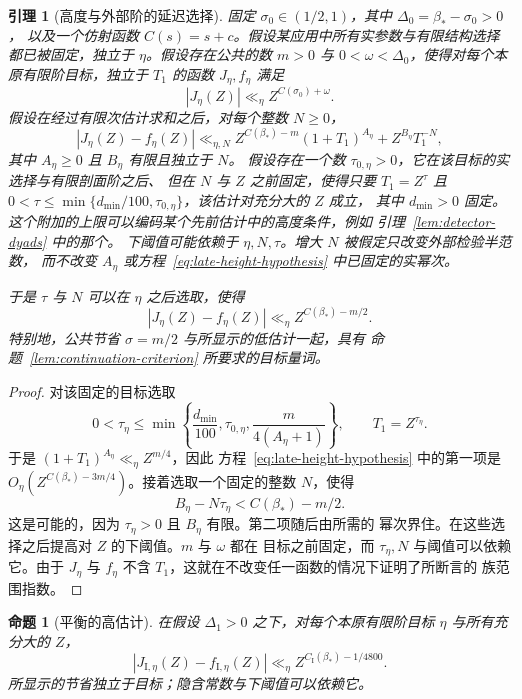 \documentclass[11pt,a4paper]{article}
\numberwithin{equation}{section}
\numberwithin{figure}{section}
\newtheorem{proposition}[theorem]{命题}
\newtheorem{lemma}[theorem]{引理}
\theoremstyle{definition}
\theoremstyle{remark}
\begin{document}
\begin{lemma}[高度与外部阶的延迟选择]
\label{lem:late-height-closure}
固定 $\sigma_0\in(1/2,1)$，其中 $\Delta_0=\beta_*-\sigma_0>0$，
以及一个仿射函数 $C(s)=s+c$。假设某应用中所有实参数与有限结构选择
都已被固定，独立于 $\eta$。假设存在公共的数 $m>0$ 与
$0<\omega<\Delta_0$，使得对每个本原有限阶目标，独立于 $T_1$ 的函数
$J_\eta,f_\eta$ 满足
\[
 |J_\eta(Z)|\ll_\eta Z^{C(\sigma_0)+\omega}.
\]
假设在经过有限次估计求和之后，对每个整数 $N\ge0$，
\begin{equation}
 |J_\eta(Z)-f_\eta(Z)|
 \ll_{\eta,N} Z^{C(\beta_*)-m}(1+T_1)^{A_\eta}
       +Z^{B_\eta}T_1^{-N},
 \label{eq:late-height-hypothesis}
\end{equation}
其中 $A_\eta\ge0$ 且 $B_\eta$ 有限且独立于 $N$。
假设存在一个数 $\tau_{0,\eta}>0$，它在该目标的实选择与有限剖面阶之后、
但在 $N$ 与 $Z$ 之前固定，使得只要 $T_1=Z^\tau$ 且
$0<\tau\le\min\{d_{\min}/100,\tau_{0,\eta}\}$，该估计对充分大的 $Z$ 成立，
其中 $d_{\min}>0$ 固定。
这个附加的上限可以编码某个先前估计中的高度条件，例如
引理~\ref{lem:detector-dyads} 中的那个。
下阈值可能依赖于 $\eta,N,\tau$。增大 $N$ 被假定只改变外部检验半范数，
而不改变 $A_\eta$ 或方程~\eqref{eq:late-height-hypothesis} 中已固定的实幂次。

于是 $\tau$ 与 $N$ 可以在 $\eta$ 之后选取，使得
\[
 |J_\eta(Z)-f_\eta(Z)|\ll_\eta Z^{C(\beta_*)-m/2}.
\]
特别地，公共节省 $\sigma=m/2$ 与所显示的低估计一起，具有
命题~\ref{lem:continuation-criterion} 所要求的目标量词。
\end{lemma}

\begin{proof}
对该固定的目标选取
\[
0<\tau_\eta\le
 \min\left\{\frac{d_{\min}}{100},\tau_{0,\eta},
                 \frac{m}{4(A_\eta+1)}\right\},
 \qquad T_1=Z^{\tau_\eta}.
\]
于是 $(1+T_1)^{A_\eta}\ll_\eta Z^{m/4}$，因此
方程~\eqref{eq:late-height-hypothesis} 中的第一项是
$O_\eta(Z^{C(\beta_*)-3m/4})$。接着选取一个固定的整数 $N$，使得
\[
 B_\eta-N\tau_\eta<C(\beta_*)-m/2.
\]
这是可能的，因为 $\tau_\eta>0$ 且 $B_\eta$ 有限。第二项随后由所需的
幂次界住。在这些选择之后提高对 $Z$ 的下阈值。$m$ 与 $\omega$ 都在
目标之前固定，而 $\tau_\eta,N$ 与阈值可以依赖它。由于 $J_\eta$ 与
$f_\eta$ 不含 $T_1$，这就在不改变任一函数的情况下证明了所断言的
族范围指数。
\end{proof}

\begin{proposition}[平衡的高估计]
\label{prop:balanced-high}
在假设 $\Delta_1>0$ 之下，对每个本原有限阶目标 $\eta$ 与所有充分大的
$Z$，
\[
 |J_{\mathrm I,\eta}(Z)-f_{\mathrm I,\eta}(Z)|
 \ll_\eta Z^{C_{\mathrm I}(\beta_*)-1/4800}.
\]
所显示的节省独立于目标；隐含常数与下阈值可以依赖它。
\end{proposition}
\end{document}
